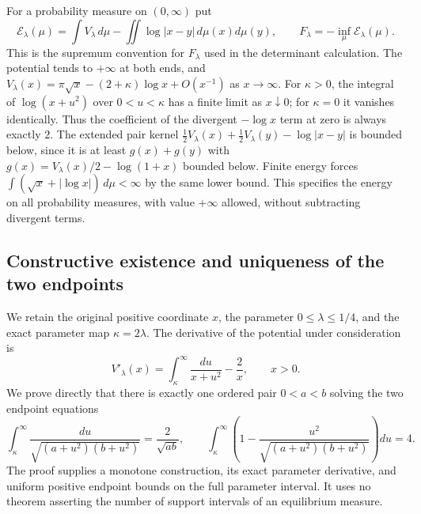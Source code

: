 \documentclass[11pt,a4paper]{article}
\begin{document}
For a probability measure on $(0,\infty)$ put
\begin{equation}\tag{KME3}
 \mathcal E_\lambda(\mu)=\int V_\lambda\,d\mu
        -\iint\log|x-y|\,d\mu(x)d\mu(y),\qquad
 F_\lambda=-\inf_\mu\mathcal E_\lambda(\mu).
\end{equation}
This is the supremum convention for $F_\lambda$ used in the determinant
calculation. The potential tends to $+\infty$ at both ends, and
$V_\lambda(x)=\pi\sqrt x-(2+\kappa)\log x+O(x^{-1})$ as $x\to\infty$.
For $\kappa>0$, the integral of $\log(x+u^2)$ over $0<u<\kappa$ has a finite
limit as $x\downarrow0$; for $\kappa=0$ it vanishes identically. Thus the
coefficient of the divergent $-\log x$ term at zero is always exactly $2$.
The extended pair kernel
$\tfrac12V_\lambda(x)+\tfrac12V_\lambda(y)-\log|x-y|$
is bounded below, since it is at least $g(x)+g(y)$ with
$g(x)=V_\lambda(x)/2-\log(1+x)$ bounded below.
Finite energy forces $\int(\sqrt x+|\log x|)\,d\mu<\infty$ by the
same lower bound.  This specifies the energy on all probability measures,
with value $+\infty$ allowed, without subtracting divergent terms.


\subsection{Constructive existence and uniqueness of the two endpoints}
\label{sec:shifted-gamma-endpoint-existence}

We retain the original positive coordinate $x$, the parameter
$0\leq\lambda\leq1/4$, and the exact parameter map $\kappa=2\lambda$.
The derivative of the potential under consideration is
\begin{equation}\tag{KEP1}
 V'_\lambda(x)=\int_\kappa^\infty\frac{du}{x+u^2}-\frac2x,
 \qquad x>0.
\end{equation}
We prove directly that there is exactly one ordered pair $0<a<b$ solving
the two endpoint equations
\begin{equation}\tag{KEP2}
 \int_\kappa^\infty\frac{du}{\sqrt{(a+u^2)(b+u^2)}}
       =\frac2{\sqrt{ab}},\qquad
 \int_\kappa^\infty\left(1-
       \frac{u^2}{\sqrt{(a+u^2)(b+u^2)}}\right)du=4.
\end{equation}
The proof supplies a monotone construction, its exact parameter derivative,
and uniform positive endpoint bounds on the full parameter interval. It
uses no theorem asserting the number of support intervals of an
equilibrium measure.
\end{document}
